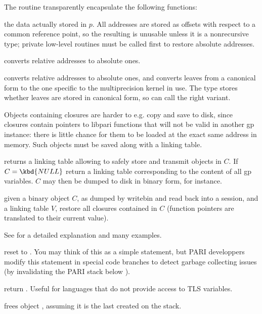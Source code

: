 \noindent The routine  transparently encapsulate the following
functions:

 the  data actually stored in $p$.
All addresses are stored as offsets with respect to a common reference point,
so the resulting  is unusable unless it is a nonrecursive type;
private low-level routines must be called first to restore absolute addresses.

 converts relative addresses to
absolute ones.

 converts relative addresses to
absolute ones, and converts leaves from a canonical form to the one
specific to the multiprecision kernel in use. The  type stores
whether leaves are stored in canonical form, so  can call
the right variant.

\noindent Objects containing closures are harder to e.g. copy and save to disk,
since closures contain pointers to libpari functions that will not be valid in
another gp instance: there is little chance for them to be loaded at the exact
same address in memory. Such objects must be saved along with a linking table.

 returns a linking table allowing to safely
store and transmit  objects in $C$.  If $C = \kbd{NULL}$ return a
linking table corresponding to the content of all gp variables. $C$ may then be
dumped to disk in binary form, for instance.

 given a binary object $C$, as dumped
by writebin and read back into a session, and a linking table $V$, restore all
closures contained in $C$ (function pointers are translated to their current
value).

\label{se:garbage2}
See  for a detailed explanation and many examples.

 reset  to . You may think
of this as a simple  statement, but PARI developpers modify
this statement in special code branches to detect garbage collecting
issues (by invalidating the PARI stack below ).

 return . Useful for languages that
do not provide access to TLS variables.

 frees object , assuming it is the last created
on the stack.


